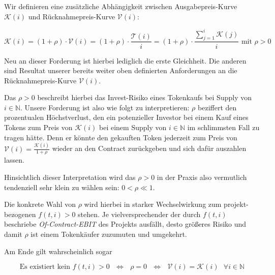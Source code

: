 \begin{Praemisse}

Wir definieren eine zusätzliche Abhängigkeit zwischen Ausgabepreis-Kurve $\mathcal{K} \left( i \right)$ und Rücknahmepreis-Kurve $\mathcal{V} \left( i \right)$:

\begin{equation*}
\mathcal{K} \left( i \right) = \left( 1 + \rho \right) \cdot \mathcal{V} \left( i \right) = \left( 1 + \rho \right) \cdot \frac{\mathcal{T} \left( i \right)}{i} = \left( 1 + \rho \right) \cdot \frac{\sum_{j = 1}^{i} \mathcal{K} \left( j \right)}{i} \textrm{  mit } \rho > 0
\end{equation*}

Neu an dieser Forderung ist hierbei lediglich die erste Gleichheit. Die anderen sind Resultat unserer bereits weiter oben definierten Anforderungen an die Rücknahmepreis-Kurve $\mathcal{V} \left( i \right)$.

\vspace{0.3cm}

Das $\rho > 0$ beschreibt hierbei das Invest-Risiko eines Tokenkaufs bei Supply von $i \in \mathbb{N}$. Unsere Forderung ist also wie folgt zu interpretieren: $\rho$ beziffert den prozentualen Höchstverlust, den ein potenzieller Investor bei einem Kauf eines Tokens zum Preis von $\mathcal{K} \left( i \right)$ bei einem Supply von $i \in \mathbb{N}$ im schlimmsten Fall zu tragen hätte. Denn er könnte den gekauften Token jederzeit zum Preis von $\mathcal{V} \left( i \right) = \frac{\mathcal{K} \left( i \right)}{1 + \rho}$ wieder an den Contract zurückgeben und sich dafür auszahlen lassen.

\vspace{0.1cm}

Hinsichtlich dieser Interpretation wird das $\rho > 0$ in der Praxis also vermutlich tendenziell sehr klein zu wählen sein: $0 < \rho \ll 1$.

\vspace{0.1cm}

Die konkrete Wahl von $\rho$ wird hierbei in starker Wechselwirkung zum projekt-bezogenen $f(t, i) > 0$ stehen. Je vielversprechender der durch $f(t, i)$ beschriebe \textit{Of-Contract-EBIT} des Projekts ausfällt, desto größeres Risiko und damit $\rho$ ist einem Tokenkäufer zuzumuten und umgekehrt. 

\vspace{0.1cm}

Am Ende gilt wahrscheinlich sogar 

\begin{equation*}
\textrm{Es existiert kein  } f(t, i) > 0 \textrm{   } \Leftrightarrow \textrm{   } \rho = 0 \textrm{   } \Leftrightarrow \textrm{   } \mathcal{V} \left( i \right) = \mathcal{K} \left( i \right) \textrm{  } \forall i \in \mathbb{N}
\end{equation*}

\end{Praemisse}


